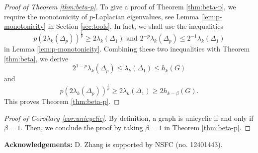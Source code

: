 \documentclass[12pt, reqno]{article}
\begin{document}
\begin{proof}[Proof of Theorem \ref{thm:beta-p}] To give a proof of Theorem \ref{thm:beta-p}, we require the monotonicity of $p$-Laplacian eigenvalues, see Lemma \ref{lem:p-monotonicity} in Section \ref{sec:tools}. In fact, we shall use the inequalities \[p(2\lambda_k(\Delta_p))^{\frac1p}\ge 2\lambda_k(\Delta_1)\text{ and }2^{-p}\lambda_k(\Delta_p)\le 2^{-1}\lambda_k(\Delta_1)\] in Lemma \ref{lem:p-monotonicity}. Combining these two inequalities with Theorem \ref{thm:beta}, we derive
$$2^{1-p}\lambda_k(\Delta_p)\le \lambda_k(\Delta_1)\le h_k(G)$$
and 
$$p(2\lambda_k(\Delta_p))^{\frac1p}\ge 2\lambda_k(\Delta_1)\ge 2h_{k-\beta}(G).$$
This proves Theorem \ref{thm:beta-p}.
\end{proof}


\begin{proof}[Proof of Corollary \ref{cor:unicyclic}]
By definition, a graph is unicyclic if and only if $\beta=1$. Then, we conclude the proof by taking $\beta=1$ in Theorem \ref{thm:beta-p}.
\end{proof}

\vspace{0.6cm}

{\bf Acknowledgements:} 
D. Zhang is supported by NSFC (no. 12401443).
\end{document}
